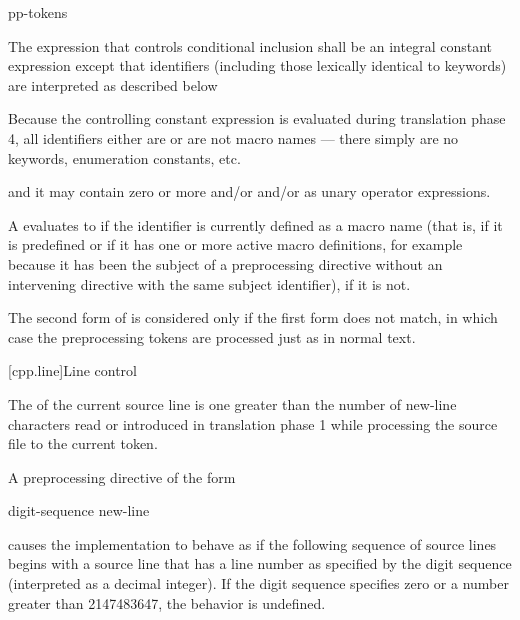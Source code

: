 \documentclass{wg21}
\begin{document}
%
\begin{bnf}
    \br
     pp-tokens \terminal{)}
\end{bnf}

\pnum
The expression that controls conditional inclusion
shall be an integral constant expression except that
identifiers
(including those lexically identical to keywords)
are interpreted as described below
\begin{footnote}
    Because the controlling constant expression is evaluated
    during translation phase 4,
    all identifiers either are or are not macro names ---
    there simply are no keywords, enumeration constants, etc.
\end{footnote}
and it may contain zero or more  and/or
 and/or
 as unary operator expressions.

\pnum
A  evaluates to 
if the identifier is currently defined
as a macro name
(that is, if it is predefined
or if it has one or more active macro definitions,
for example because
it has been the subject of a
preprocessing directive
without an intervening
directive with the same subject identifier),  if it is not.

\pnum
The second form of 
is considered only if the first form does not match,
in which case the preprocessing tokens are processed just as in normal text.


[cpp.line]{Line control}%
%

\pnum
{}
\pnum
The
of the current source line is one greater than
the number of new-line characters read or introduced
in translation phase 1
while processing the source file to the current token.

\pnum
A preprocessing directive of the form
\begin{ncsimplebnf}
     digit-sequence new-line
\end{ncsimplebnf}
causes the implementation to behave as if
the following sequence of source lines begins with a
source line that has a line number as specified
by the digit sequence (interpreted as a decimal integer).
If the digit sequence specifies zero
or a number greater than 2147483647,
the behavior is undefined.
\end{document}
